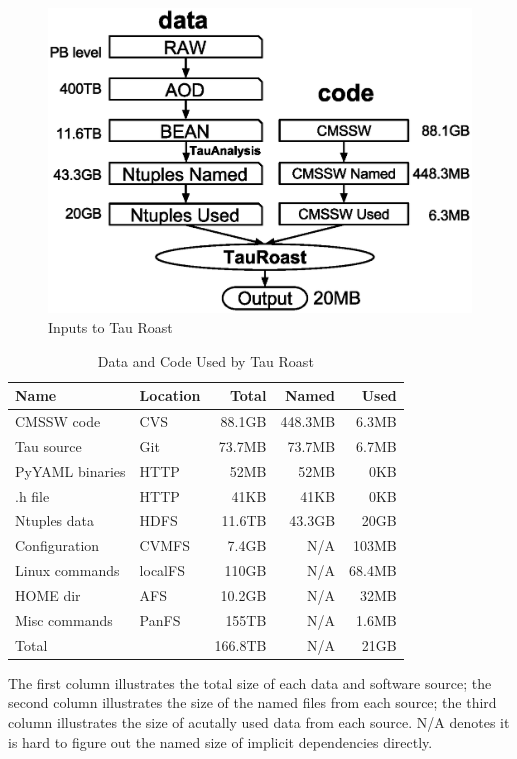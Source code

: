 \documentclass{sig-alternate}
\begin{document}
\begin{figure}[t]
\centering
\includegraphics[width=.8\columnwidth]{data-code-size.eps}
\caption{Inputs to Tau Roast}
\label{fig:data-code-size}
\end{figure}

\begin{table}[t]
    \centering
    \small
    \begin{tabular}{|l|l|r|r|r|}
        \hline
        \bf Name & \bf Location & \bf Total & \bf Named & \bf Used \\ 
        \hline
        CMSSW code     & CVS & 88.1GB & 448.3MB & 6.3MB\\ \hline
        Tau source       & Git & 73.7MB & 73.7MB & 6.7MB \\ \hline
        PyYAML binaries    & HTTP & 52MB & 52MB & 0KB \\ \hline
        .h file       & HTTP& 41KB & 41KB & 0KB \\ \hline \hline
        Ntuples data    & HDFS& 11.6TB & 43.3GB & 20GB \\ \hline
        Configuration & CVMFS & 7.4GB & N/A & 103MB \\ \hline
        Linux commands & localFS & 110GB &  N/A & 68.4MB \\ \hline     
        HOME dir& AFS &10.2GB & N/A & 32MB\\ \hline
        Misc commands & PanFS & 155TB & N/A  & 1.6MB \\ \hline
        Total      &    & 166.8TB            & N/A & 21GB \\ \hline
    \end{tabular}
    \begin{tablenotes}
      \small
      \item The first column illustrates the total size of each data and software source; 
            the second column illustrates the size of the named files from each source;
            the third column illustrates the size of acutally used data from each source.
            N/A denotes it is hard to figure out the named size of implicit dependencies directly.        
    \end{tablenotes}
    \caption{Data and Code Used by Tau Roast}
    \label{table:size-original-real}
\end{table}
\end{document}
